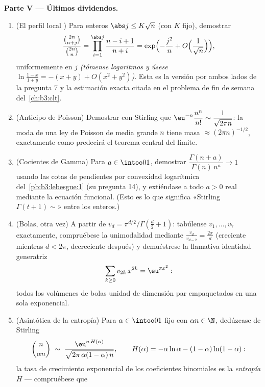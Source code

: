 \begin{problem}
\medskip
\noindent\textbf{Parte V --- Últimos dividendos.}
\begin{enumerate}[resume]
  \item (El perfil local ) Para enteros $\abs j \leq
        K\sqrt n$ (con $K$ fijo), demostrar
        \[
        \frac{\binom{2n}{n+j}}{\binom{2n}{n}} =
        \prod_{i=1}^{\abs j}\frac{n - i + 1}{n + i}
        = \exp\Bigl(-\frac{j^2}n +
        O\Bigl(\frac1{\sqrt n}\Bigr)\Bigr),
        \]
        uniformemente en $j$ \emph{(tómense logaritmos y úsese $\ln
        \frac{1-x}{1+y} = -(x + y) + O(x^2 + y^2)$)}. Esta es la versión
        por ambos lados de la pregunta 7 y la estimación exacta citada
        en el problema de fin de semana del~\cref{ch:b3:clt}. \item
        (Anticipo de Poisson) Demostrar con Stirling que
        $\eu^{-n}\dfrac{n^n}{n!} \sim \dfrac1{\sqrt{2\pi n}}$:
        la moda de una ley de Poisson de media grande $n$ tiene masa
        $\approx (2\pi n)^{-1/2}$, exactamente como predecirá el teorema
        central del límite. \item (Cocientes de Gamma) Para
        $a \in \intoo01$, demostrar
        $\dfrac{\Gamma(n + a)}{\Gamma(n)\,n^a} \to 1$ usando las cotas
        de pendientes por convexidad logarítmica
        del~\cref{pb:b3:lebesgue:1} (su pregunta 14), y extiéndase a
        todo $a > 0$ real mediante la ecuación funcional. (Esto es lo
        que significa «Stirling $\Gamma(t+1) \sim$» entre los enteros.)
        \item (Bolas, otra vez) A partir de
        $v_d = \pi^{d/2}/\Gamma(\frac d2
        + 1)$: tabúlense $v_1, \dots, v_7$ exactamente, compruébese la
        unimodalidad mediante $\frac{v_d}{v_{d-2}} = \frac{2\pi}d$
        (creciente mientras $d < 2\pi$, decreciente después) y
        demuéstrese la llamativa identidad generatriz
        \[
        \sum_{k\geq0}v_{2k}\,x^{2k} = \eu^{\pi x^2} :
        \]
        todos los volúmenes de bolas unidad de dimensión par
        empaquetados en una sola exponencial. \item (Asintótica de la
        entropía) Para $\alpha \in \intoo01$ fijo con $\alpha n \in \N$,
        dedúzcase de Stirling
        \[
        \binom{n}{\alpha n} \;\sim\;
        \frac{\eu^{n\,H(\alpha)}}
        {\sqrt{2\pi\,\alpha(1-\alpha)\,n}},
        \qquad
        H(\alpha) = -\alpha\ln\alpha -
        (1-\alpha)\ln(1-\alpha) :
        \]
        la tasa de crecimiento exponencial de los coeficientes
        binomiales es la \emph{entropía} $H$ --- compruébese que

\end{enumerate}
\end{problem}
